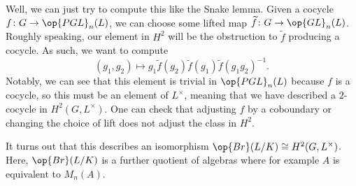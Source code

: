 \documentclass[../notes.tex]{subfiles}
\begin{document}
Well, we can just try to compute this like the Snake lemma. Given a cocycle $f\colon G\to\op{PGL}_n(L)$, we can choose some lifted map $\widetilde f\colon G\to\op{GL}_n(L)$. Roughly speaking, our element in $H^2$ will be the obstruction to $\widetilde f$ producing a cocycle. As such, we want to compute
\[(g_1,g_2)\mapsto g_1\widetilde f(g_2)\widetilde f(g_1)\widetilde f(g_1g_2)^{-1}.\]
Notably, we can see that this element is trivial in $\op{PGL}_n(L)$ because $f$ is a cocycle, so this must be an element of $L^\times$, meaning that we have described a $2$-cocycle in $H^2(G,L^\times)$. One can check that adjusting $f$ by a coboundary or changing the choice of lift does not adjust the class in $H^2$.
\begin{remark}
	It turns out that this describes an isomorphism $\op{Br}(L/K)\cong H^2(G,L^\times)$. Here, $\op{Br}(L/K)$ is a further quotient of algebras where for example $A$ is equivalent to $M_n(A)$.
\end{remark}
\end{document}
